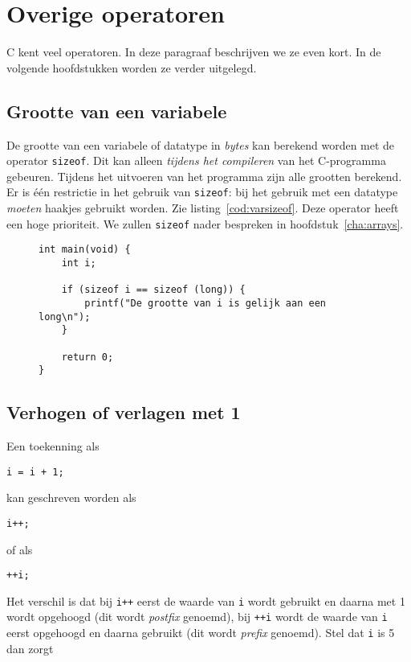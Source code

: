 \section{Overige operatoren}
C kent veel operatoren. In deze paragraaf beschrijven we ze even kort. In de volgende hoofdstukken worden ze verder uitgelegd.

\subsection{Grootte van een variabele}
De grootte van een variabele of datatype in \textsl{bytes} kan berekend worden met de operator \texttt{sizeof}. Dit kan alleen \textsl{tijdens het compileren} van het C-programma gebeuren. Tijdens het uitvoeren van het programma zijn alle grootten berekend. Er is één restrictie in het gebruik van \texttt{sizeof}: bij het gebruik met een datatype \textsl{moeten} haakjes gebruikt worden. Zie listing~\ref{cod:varsizeof}. Deze operator heeft een hoge prioriteit. We zullen \texttt{sizeof} nader bespreken in hoofdstuk~\ref{cha:arrays}.

\begin{figure}[!ht]
\begin{lstlisting}[caption=Gebruik van \texttt{sizeof}.,label=cod:varsizeof]
int main(void) {
	int i;

    if (sizeof i == sizeof (long)) {
        printf("De grootte van i is gelijk aan een long\n");
    }

    return 0;
}
\end{lstlisting}
\end{figure}

\subsection{Verhogen of verlagen met 1}
Een toekenning als

\hspace*{1em}\texttt{i = i + 1;}

kan geschreven worden als

\hspace*{1em}\texttt{i++;}

of als 

\hspace*{1em}\texttt{++i;}

Het verschil is dat bij \texttt{i++} eerst de waarde van \texttt{i} wordt gebruikt en daarna met 1 wordt opgehoogd (dit wordt \textsl{postfix} genoemd), bij \texttt{++i} wordt de waarde van \texttt{i} eerst opgehoogd en daarna gebruikt (dit wordt \textsl{prefix} genoemd). Stel dat \texttt{i} is 5 dan zorgt

